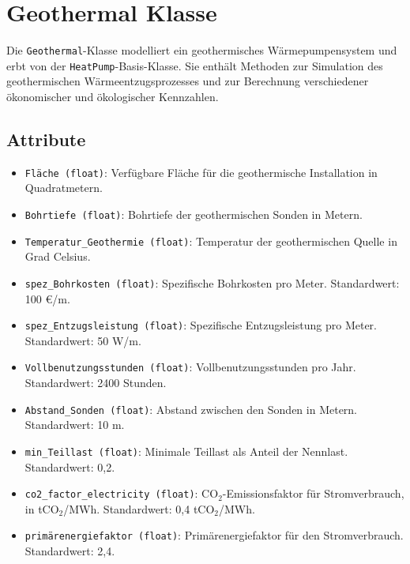\section{Geothermal Klasse}
Die \texttt{Geothermal}-Klasse modelliert ein geothermisches Wärmepumpensystem und erbt von der \texttt{HeatPump}-Basis-Klasse. Sie enthält Methoden zur Simulation des geothermischen Wärmeentzugsprozesses und zur Berechnung verschiedener ökonomischer und ökologischer Kennzahlen.

\subsection{Attribute}
\begin{itemize}
    \item \texttt{Fläche (float)}: Verfügbare Fläche für die geothermische Installation in Quadratmetern.
    \item \texttt{Bohrtiefe (float)}: Bohrtiefe der geothermischen Sonden in Metern.
    \item \texttt{Temperatur\_Geothermie (float)}: Temperatur der geothermischen Quelle in Grad Celsius.
    \item \texttt{spez\_Bohrkosten (float)}: Spezifische Bohrkosten pro Meter. Standardwert: 100 €/m.
    \item \texttt{spez\_Entzugsleistung (float)}: Spezifische Entzugsleistung pro Meter. Standardwert: 50 W/m.
    \item \texttt{Vollbenutzungsstunden (float)}: Vollbenutzungsstunden pro Jahr. Standardwert: 2400 Stunden.
    \item \texttt{Abstand\_Sonden (float)}: Abstand zwischen den Sonden in Metern. Standardwert: 10 m.
    \item \texttt{min\_Teillast (float)}: Minimale Teillast als Anteil der Nennlast. Standardwert: 0,2.
    \item \texttt{co2\_factor\_electricity (float)}: CO$_2$-Emissionsfaktor für Stromverbrauch, in tCO$_2$/MWh. Standardwert: 0,4 tCO$_2$/MWh.
    \item \texttt{primärenergiefaktor (float)}: Primärenergiefaktor für den Stromverbrauch. Standardwert: 2,4.
\end{itemize}

